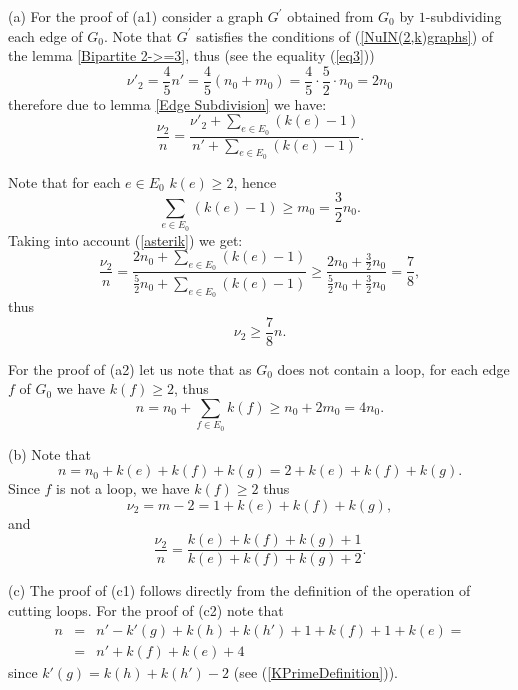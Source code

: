 \documentclass[fleqn,12pt,twoside]{article}
\newenvironment{proof}[1][Proof.]{\begin{trivlist}
\item[\hskip \labelsep {\bfseries #1}]}{\end{trivlist}}
\begin{document}
\begin{proof}
(a) For the proof of (a1) consider a graph $G^{\prime }$ obtained from $G_{0} $ by $1$-subdividing each edge of $G_{0}$. Note that
$G^{\prime }$ satisfies the conditions of (\ref{NuIN(2,k)graphs}) of
the lemma \ref{Bipartite 2->=3}, thus (see
the equality (\ref{eq3}))\begin{equation*}
\nu' _{2}=\frac{4}{5}n' =\frac{4}{5}(n_0 +m_0)=\frac{4}{5}\cdot \frac{5}{2}\cdot n_0=2n_0
\end{equation*}therefore due to lemma \ref{Edge Subdivision} we have:\begin{equation}
\frac{\nu _{2}}{n }=\frac{\nu' _{2}+\sum_{e\in E_{0}}(k(e)-1)}{n'
+\sum_{e\in E_{0}}(k(e)-1)}\text{.} \label{asterik}
\end{equation}

Note that for each $e\in E_{0}$ $k(e)\geq 2$, hence
\begin{equation*}
\sum_{e\in E_{0}}(k(e)-1)\geq m_0 =\frac{3}{2}n_0.
\end{equation*}Taking into account (\ref{asterik}) we get:
\begin{equation*}
\frac{\nu _{2}}{n }=\frac{2n_0 +\sum_{e\in E_{0}}(k(e)-1)}{\frac{5}{2}n_0 +\sum_{e\in E_{0}}(k(e)-1)}\geq \frac{2n_0
+\frac{3}{2}n_0 }{\frac{5}{2}n_0 +\frac{3}{2}n_0 }=\frac{7}{8},
\end{equation*}thus
\begin{equation*}
\nu _{2}\geq \frac{7}{8}n .
\end{equation*}

For the proof of (a2) let us note that as $G_{0}$ does not contain a
loop, for each edge $f$ of $G_{0}$ we have $k(f)\geq 2$, thus
\begin{equation*}
n =n_0 +\sum_{f\in E_{0}}k(f)\geq n_0+2m_0 =4n_0.
\end{equation*}

(b) Note that
\begin{equation*}
n =n_0 +k(e)+k(f)+k(g)=2+k(e)+k(f)+k(g).
\end{equation*}
Since $f$ is not a loop, we have $k(f)\geq 2$ thus
\begin{equation*}
\nu _{2}=m -2=1+k(e)+k(f)+k(g),
\end{equation*}
and
\begin{equation*}
\frac{\nu _{2}}{n }=\frac{k(e)+k(f)+k(g)+1}{k(e)+k(f)+k(g)+2}.
\end{equation*}

(c) The proof of (c1) follows directly from the definition of the
operation of cutting loops. For the proof of (c2) note that
\begin{eqnarray*}
n &=&n'
-k'(g)+k(h)+k(h')+1+k(f)+1+k(e)= \\
&=&n'+k(f)+k(e)+4
\end{eqnarray*}
since $k'(g)=k(h)+k(h')-2$ (see (\ref{KPrimeDefinition})).


\end{proof}
\end{document}
